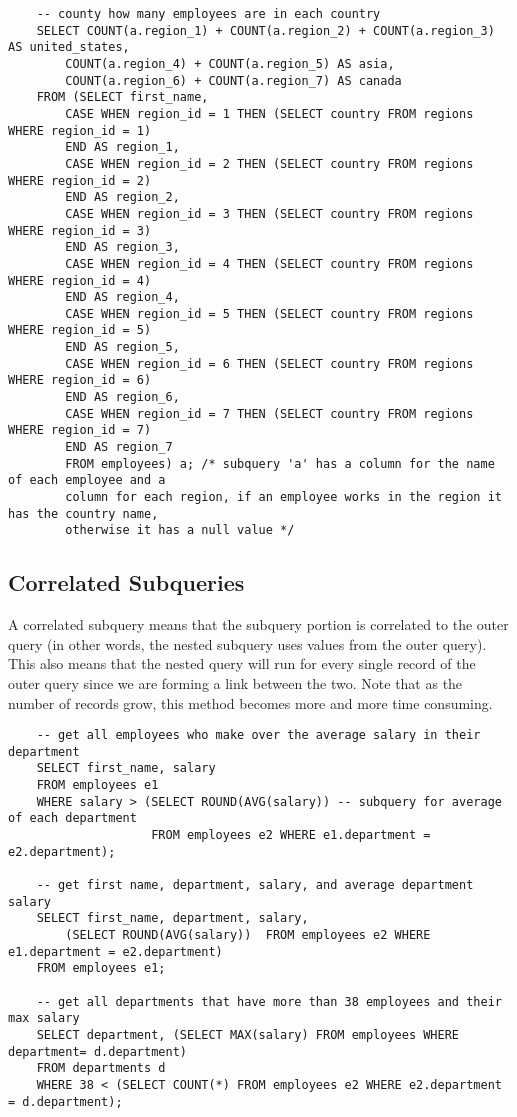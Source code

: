 \documentclass[11pt, a4paper]{article}
\begin{document}
\begin{spacing}{1.1}
\begin{lstlisting}
	-- county how many employees are in each country
	SELECT COUNT(a.region_1) + COUNT(a.region_2) + COUNT(a.region_3) AS united_states,
		COUNT(a.region_4) + COUNT(a.region_5) AS asia,
		COUNT(a.region_6) + COUNT(a.region_7) AS canada
	FROM (SELECT first_name,
		CASE WHEN region_id = 1 THEN (SELECT country FROM regions WHERE region_id = 1) 
		END AS region_1,
		CASE WHEN region_id = 2 THEN (SELECT country FROM regions WHERE region_id = 2) 
		END AS region_2,
		CASE WHEN region_id = 3 THEN (SELECT country FROM regions WHERE region_id = 3) 
		END AS region_3,
		CASE WHEN region_id = 4 THEN (SELECT country FROM regions WHERE region_id = 4) 
		END AS region_4,
		CASE WHEN region_id = 5 THEN (SELECT country FROM regions WHERE region_id = 5) 
		END AS region_5,
		CASE WHEN region_id = 6 THEN (SELECT country FROM regions WHERE region_id = 6) 
		END AS region_6,
		CASE WHEN region_id = 7 THEN (SELECT country FROM regions WHERE region_id = 7) 
		END AS region_7
		FROM employees) a; /* subquery 'a' has a column for the name of each employee and a 
		column for each region, if an employee works in the region it has the country name,
		otherwise it has a null value */  \end{lstlisting} \vspace*{5mm}
	
	\subsection{Correlated Subqueries}
	A correlated subquery means that the subquery portion is correlated to the outer query (in other words, the nested subquery uses values from the outer query). This also means that the nested query will run for every single record of the outer query since we are forming a link between the two. Note that as the number of records grow, this method becomes more and more time consuming.
	\begin{lstlisting}
	-- get all employees who make over the average salary in their department
	SELECT first_name, salary
	FROM employees e1
	WHERE salary > (SELECT ROUND(AVG(salary)) -- subquery for average of each department
	                FROM employees e2 WHERE e1.department = e2.department);
	                
	-- get first name, department, salary, and average department salary                  
	SELECT first_name, department, salary,
		(SELECT ROUND(AVG(salary))  FROM employees e2 WHERE e1.department = e2.department) 
	FROM employees e1;
	
	-- get all departments that have more than 38 employees and their max salary
	SELECT department, (SELECT MAX(salary) FROM employees WHERE department= d.department)
	FROM departments d
	WHERE 38 < (SELECT COUNT(*) FROM employees e2 WHERE e2.department = d.department); \end{lstlisting} \newpage
	

\end{spacing}
\end{document}
